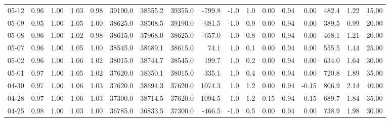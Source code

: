 \begin{threeparttable}
{\begin{tabular}{lrrrrrrrrrrrrrrrr}
  05-12 &         0.96 &           1.00 &          1.03 &          0.98 & 39190.0 & 38555.2 & 39355.0 &     -799.8 &                     -1.0 &                 1.0 &       0.00 &      0.94 &           0.00 &            482.4 &            1.22 &                  15.00 \\
  05-09 &         0.95 &           1.00 &          1.05 &          1.00 & 38625.0 & 38508.5 & 39190.0 &     -681.5 &                     -1.0 &                 0.9 &       0.00 &      0.94 &           0.00 &            389.5 &            0.99 &                  20.00 \\
  05-08 &         0.96 &           1.00 &          1.02 &          0.98 & 38615.0 & 37968.0 & 38625.0 &     -657.0 &                     -1.0 &                 0.8 &       0.00 &      0.94 &           0.00 &            468.1 &            1.21 &                  20.00 \\
  05-07 &         0.96 &           1.00 &          1.05 &          1.00 & 38545.0 & 38689.1 & 38615.0 &       74.1 &                      1.0 &                 0.1 &       0.00 &      0.94 &           0.00 &            555.5 &            1.44 &                  25.00 \\
  05-02 &         0.96 &           1.00 &          1.06 &          1.02 & 38015.0 & 38744.7 & 38545.0 &      199.7 &                      1.0 &                 0.2 &       0.00 &      0.94 &           0.00 &            634.0 &            1.64 &                  30.00 \\
  05-01 &         0.97 &           1.00 &          1.05 &          1.02 & 37620.0 & 38350.1 & 38015.0 &      335.1 &                      1.0 &                 0.4 &       0.00 &      0.94 &           0.00 &            720.8 &            1.89 &                  35.00 \\
  04-30 &         0.97 &           1.00 &          1.06 &          1.03 & 37620.0 & 38694.3 & 37620.0 &     1074.3 &                      1.0 &                 1.2 &       0.00 &      0.94 &          -0.15 &            806.9 &            2.14 &                  40.00 \\
  04-28 &         0.97 &           1.00 &          1.06 &          1.03 & 37300.0 & 38714.5 & 37620.0 &     1094.5 &                      1.0 &                 1.2 &       0.15 &      0.94 &           0.15 &            689.7 &            1.84 &                  35.00 \\
  04-25 &         0.98 &           1.00 &          1.03 &          1.00 & 36785.0 & 36833.5 & 37300.0 &     -466.5 &                     -1.0 &                 0.5 &       0.00 &      0.94 &           0.00 &            738.9 &            1.98 &                  30.00 \\

\end{tabular}}
\end{threeparttable}
